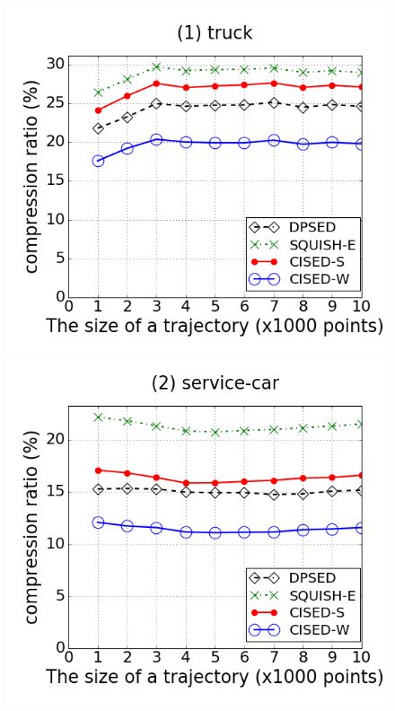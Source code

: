 \begin{figure}[tb!]
\centering
\includegraphics[scale = 0.240]{Figures/Exp-CR-size-truck.png}
\includegraphics[scale = 0.240]{Figures/Exp-CR-size-service.png}

\end{figure}
